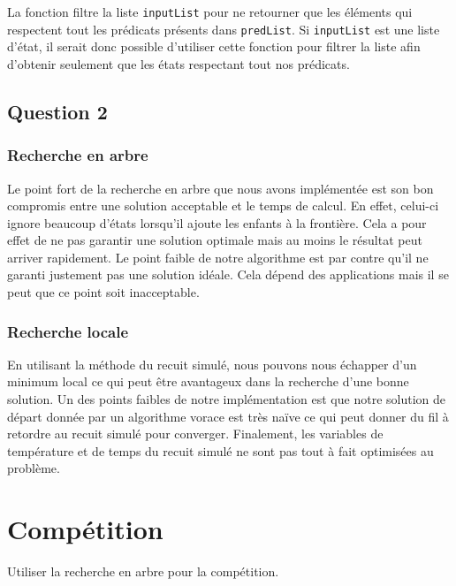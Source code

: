 \documentclass[a4paper, 12pt]{article} %
\begin{document}
La fonction filtre la liste \texttt{inputList} pour ne retourner que les éléments qui respectent tout les prédicats présents dans \texttt{predList}.
Si \texttt{inputList} est une liste d'état, il serait donc possible d'utiliser cette fonction pour filtrer la liste afin d'obtenir seulement que les états 
respectant tout nos prédicats.

\subsection*{Question 2}
\subsubsection*{Recherche en arbre}
Le point fort de la recherche en arbre que nous avons implémentée est son bon compromis entre une solution
acceptable et le temps de calcul. En effet, celui-ci ignore beaucoup d'états lorsqu'il ajoute les enfants à la frontière.
Cela a pour effet de ne pas garantir une solution optimale mais au moins le résultat peut arriver rapidement.
Le point faible de notre algorithme est par contre qu'il ne garanti justement pas une solution idéale. Cela dépend
des applications mais il se peut que ce point soit inacceptable.

\subsubsection*{Recherche locale}
En utilisant la méthode du recuit simulé, nous pouvons nous échapper d'un minimum local ce qui peut être avantageux
dans la recherche d'une bonne solution. Un des points faibles de notre implémentation est que notre solution de départ
donnée par un algorithme vorace est très naïve ce qui peut donner du fil à retordre au recuit simulé pour converger.
Finalement, les variables de température et de temps du recuit simulé ne sont pas tout à fait optimisées au problème.

\section*{Compétition}
Utiliser la recherche en arbre pour la compétition.

\end{document}
